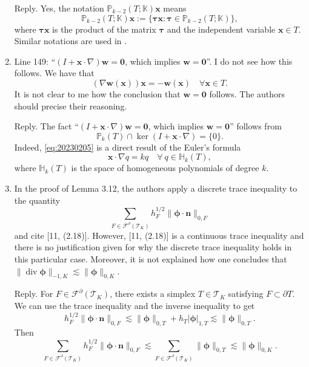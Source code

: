 \documentclass[10pt]{amsart}
\theoremstyle{definition}
\theoremstyle{remark}
\renewcommand{\div}{\operatorname{div}}
\begin{document}
\begin{enumerate}[1.]
\smallskip \noindent \textcolor[rgb]{1.00,0.00,0.00}{Reply.}
Yes, the notation $\mathbb P_{k-2}(T;\mathbb K)\boldsymbol{x}$ means
$$
\mathbb P_{k-2}(T;\mathbb K)\boldsymbol{x}:=\{\boldsymbol{\tau}\boldsymbol{x}: \boldsymbol{\tau}\in \mathbb P_{k-2}(T;\mathbb K)\},
$$
where $\boldsymbol{\tau}\boldsymbol{x}$ is the product of the matrix $\boldsymbol{\tau}$ and the independent variable $\boldsymbol{x}\in T$. Similar notations are used in \cite{ChenHuang2021divdiv,Chen;Huang:2020Finite}.

\medskip

\item \textsf{Line 149: “$(I +\boldsymbol{x}\cdot\nabla)\boldsymbol{w} = \boldsymbol{0}$, which implies $\boldsymbol{w} = \boldsymbol{0}$”. I do not see how this follows. We have that
$$(\nabla\boldsymbol{w}(\boldsymbol{x}))\boldsymbol{x}=-\boldsymbol{w}(\boldsymbol{x})\quad\forall\boldsymbol{x}\in T.
$$
It is not clear to me how the conclusion that $\boldsymbol{w} = \boldsymbol{0}$ follows. The authors
should precise their reasoning.}

\smallskip \noindent \textcolor[rgb]{1.00,0.00,0.00}{Reply.}
The fact “$(I +\boldsymbol{x}\cdot\nabla)\boldsymbol{w} = \boldsymbol{0}$, which implies $\boldsymbol{w} = \boldsymbol{0}$” follows from \cite[(35)]{Chen;Huang:2020Finite}
\begin{equation}\label{eq:20230205}
\mathbb P_{k}(T)\cap\ker(I+\boldsymbol{x}\cdot\nabla)=\{0\}.
\end{equation}
Indeed, \eqref{eq:20230205} is a direct result of the Euler's formula \cite[(2.1)]{ChenHuang2021divdiv}
$$
\boldsymbol{x}\cdot\nabla q=kq\quad\forall~q\in \mathbb H_k(T),
$$
where $\mathbb H_k(T)$ is the space of homogeneous polynomials of degree $k$.

\medskip

\item \textsf{In the proof of Lemma 3.12, the authors apply a discrete trace inequality to the
quantity 
$$
\sum_{F\in\mathcal F^{\partial}(\mathcal T_K)}h_F^{1/2}\|\boldsymbol{\phi}\cdot\boldsymbol{n}\|_{0,F}
$$
and cite [11, (2.18)]. However, [11, (2.18)] is a continuous trace inequality and there is no justification given for why the discrete trace inequality holds in this particular case. Moreover, it is not explained how one concludes that $\|\div\boldsymbol{\phi}\|_{-1,K}\lesssim \|\boldsymbol{\phi}\|_{0,K}$.}

\smallskip \noindent \textcolor[rgb]{1.00,0.00,0.00}{Reply.}
For $F\in\mathcal F^{\partial}(\mathcal T_K)$, there exists a simplex $T\in\mathcal T_K$ satisfying $F\subset\partial T$. We can use the trace inequality \cite[(2.18)]{BrennerSung2018} and the inverse inequality to get
$$
h_F^{1/2}\|\boldsymbol{\phi}\cdot\boldsymbol{n}\|_{0,F} \lesssim \|\boldsymbol{\phi}\|_{0,T}+h_T|\boldsymbol{\phi}|_{1,T}\lesssim \|\boldsymbol{\phi}\|_{0,T}.
$$ 
Then
$$
\sum_{F\in\mathcal F^{\partial}(\mathcal T_K)}h_F^{1/2}\|\boldsymbol{\phi}\cdot\boldsymbol{n}\|_{0,F} \lesssim \sum_{F\in\mathcal F^{\partial}(\mathcal T_K)}\|\boldsymbol{\phi}\|_{0,T}\lesssim \|\boldsymbol{\phi}\|_{0,K}.
$$ 


\end{enumerate}
\end{document}

